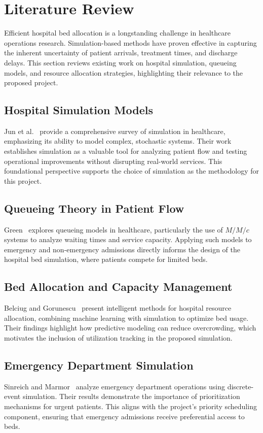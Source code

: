 \documentclass[12pt]{article}
\begin{document}
\section{Literature Review}

Efficient hospital bed allocation is a longstanding challenge in healthcare operations research. Simulation-based methods have proven effective in capturing the inherent uncertainty of patient arrivals, treatment times, and discharge delays. This section reviews existing work on hospital simulation, queueing models, and resource allocation strategies, highlighting their relevance to the proposed project.

\subsection{Hospital Simulation Models}
Jun et al.~\cite{jun1999simulation} provide a comprehensive survey of simulation in healthcare, emphasizing its ability to model complex, stochastic systems. Their work establishes simulation as a valuable tool for analyzing patient flow and testing operational improvements without disrupting real-world services. This foundational perspective supports the choice of simulation as the methodology for this project.

\subsection{Queueing Theory in Patient Flow}
Green~\cite{green2006queueing} explores queueing models in healthcare, particularly the use of $M/M/c$ systems to analyze waiting times and service capacity. Applying such models to emergency and non-emergency admissions directly informs the design of the hospital bed simulation, where patients compete for limited beds.

\subsection{Bed Allocation and Capacity Management}
Belciug and Gorunescu~\cite{belciug2015learning} present intelligent methods for hospital resource allocation, combining machine learning with simulation to optimize bed usage. Their findings highlight how predictive modeling can reduce overcrowding, which motivates the inclusion of utilization tracking in the proposed simulation.

\subsection{Emergency Department Simulation}
Sinreich and Marmor~\cite{sinreich2005emergency} analyze emergency department operations using discrete-event simulation. Their results demonstrate the importance of prioritization mechanisms for urgent patients. This aligns with the project’s priority scheduling component, ensuring that emergency admissions receive preferential access to beds.
\end{document}
